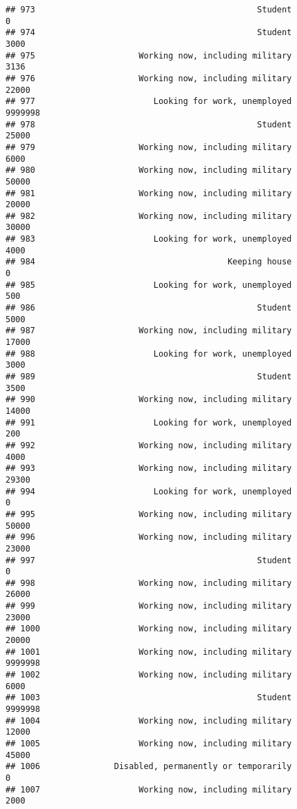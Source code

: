 \documentclass[]{book}
\theoremstyle{definition}
\theoremstyle{definition}
\theoremstyle{remark}
\begin{document}
\begin{verbatim}
## 973                                             Student               0
## 974                                             Student            3000
## 975                     Working now, including military            3136
## 976                     Working now, including military           22000
## 977                        Looking for work, unemployed         9999998
## 978                                             Student           25000
## 979                     Working now, including military            6000
## 980                     Working now, including military           50000
## 981                     Working now, including military           20000
## 982                     Working now, including military           30000
## 983                        Looking for work, unemployed            4000
## 984                                       Keeping house               0
## 985                        Looking for work, unemployed             500
## 986                                             Student            5000
## 987                     Working now, including military           17000
## 988                        Looking for work, unemployed            3000
## 989                                             Student            3500
## 990                     Working now, including military           14000
## 991                        Looking for work, unemployed             200
## 992                     Working now, including military            4000
## 993                     Working now, including military           29300
## 994                        Looking for work, unemployed               0
## 995                     Working now, including military           50000
## 996                     Working now, including military           23000
## 997                                             Student               0
## 998                     Working now, including military           26000
## 999                     Working now, including military           23000
## 1000                    Working now, including military           20000
## 1001                    Working now, including military         9999998
## 1002                    Working now, including military            6000
## 1003                                            Student         9999998
## 1004                    Working now, including military           12000
## 1005                    Working now, including military           45000
## 1006               Disabled, permanently or temporarily               0
## 1007                    Working now, including military            2000

\end{verbatim}
\end{document}
